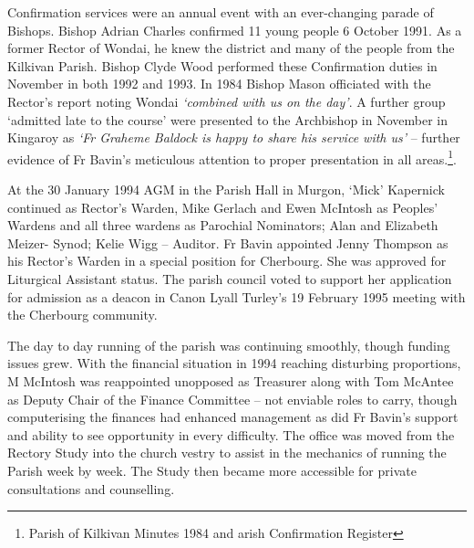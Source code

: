 Confirmation services were an annual event with an ever-changing parade of Bishops. Bishop Adrian Charles confirmed 11 young people 6 October 1991. As a former Rector of Wondai, he knew the district and many of the people from the Kilkivan Parish. Bishop Clyde Wood performed these Confirmation duties in November in both 1992 and 1993. In 1984 Bishop Mason officiated with the Rector's report noting Wondai \emph{`combined with us on the day'}. A further group `admitted late to the course' were presented to the Archbishop in November in Kingaroy as \emph{`Fr Graheme Baldock is happy to share his service with us'} -- further evidence of Fr Bavin's meticulous attention to proper presentation in all areas.\footnote{Parish of Kilkivan Minutes 1984 and arish Confirmation Register}.


At the 30 January 1994 AGM in the Parish Hall in Murgon, `Mick' Kapernick continued as Rector's Warden, Mike Gerlach and Ewen McIntosh as Peoples' Wardens and all three wardens as Parochial Nominators; Alan and Elizabeth Meizer- Synod; Kelie Wigg -- Auditor. Fr Bavin appointed Jenny Thompson as his Rector's Warden in a special position for Cherbourg. She was approved for Liturgical Assistant status. The parish council voted to support her application for admission as a deacon in Canon Lyall Turley's 19 February 1995 meeting with the Cherbourg community.



The day to day running of the parish was continuing smoothly, though funding issues grew. With the financial situation in 1994 reaching disturbing proportions, M McIntosh was reappointed unopposed as Treasurer along with Tom McAntee as Deputy Chair of the Finance Committee -- not enviable roles to carry, though computerising the finances had enhanced management as did Fr Bavin's support and ability to see opportunity in every difficulty. The office was moved from the Rectory Study into the church vestry to assist in the mechanics of running the Parish week by week. The Study then became more accessible for private consultations and counselling.









